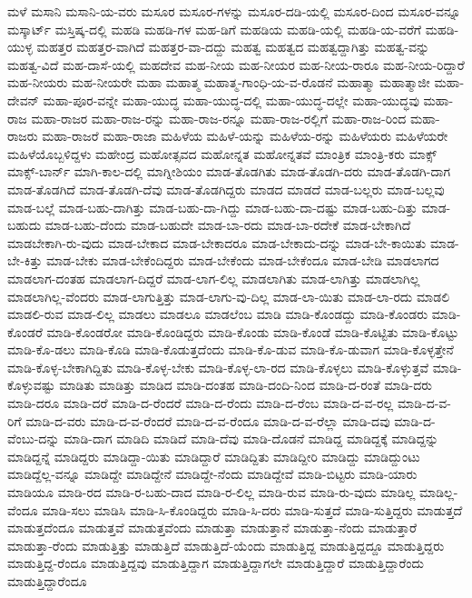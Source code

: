 {ಮಳೆ
ಮಸಾನಿ
ಮಸಾನಿ-ಯ-ವರು
ಮಸೂರ
ಮಸೂರ-ಗಳನ್ನು
ಮಸೂರ-ದಡಿ-ಯಲ್ಲಿ
ಮಸೂರ-ದಿಂದ
ಮಸೂರ-ವನ್ನೂ
ಮಸ್ಕಾರ್ಟ್
ಮಸ್ತಿಷ್ಕ-ದಲ್ಲಿ
ಮಹಡಿ
ಮಹಡಿ-ಗಳ
ಮಹ-ಡಿಗೆ
ಮಹಡಿಯ
ಮಹಡಿ-ಯಲ್ಲಿ
ಮಹಡಿ-ಯ-ವರೆಗೆ
ಮಹಡಿ-ಯುಳ್ಳ
ಮಹತ್ತರ
ಮಹತ್ತರ-ವಾಗಿದೆ
ಮಹತ್ತರ-ವಾ-ದದ್ದು
ಮಹತ್ವ
ಮಹತ್ವದ
ಮಹತ್ವದ್ದಾಗಿತ್ತು
ಮಹತ್ವ-ವನ್ನು
ಮಹತ್ವ-ವಿದೆ
ಮಹ-ದಾಸೆ-ಯಲ್ಲಿ
ಮಹದೇವ
ಮಹ-ನೀಯ
ಮಹ-ನೀಯರ
ಮಹ-ನೀಯ-ರಾರೂ
ಮಹ-ನೀಯ-ರಿದ್ದಾರೆ
ಮಹ-ನೀಯರು
ಮಹ-ನೀಯರೇ
ಮಹಾ
ಮಹಾತ್ಮ
ಮಹಾತ್ಮ-ಗಾಂಧಿ-ಯ-ವ-ರೊಡನೆ
ಮಹಾತ್ಮಾ
ಮಹಾತ್ಮಾಜೀ
ಮಹಾ-ದೇವನ್
ಮಹಾ-ಪೂರ-ವನ್ನೇ
ಮಹಾ-ಯುದ್ಧ
ಮಹಾ-ಯುದ್ಧ-ದಲ್ಲಿ
ಮಹಾ-ಯುದ್ಧ-ದಲ್ಲೇ
ಮಹಾ-ಯುದ್ಧವು
ಮಹಾ-ರಾಜ
ಮಹಾ-ರಾಜರ
ಮಹಾ-ರಾಜ-ರನ್ನು
ಮಹಾ-ರಾಜ-ರನ್ನೂ
ಮಹಾ-ರಾಜ-ರಲ್ಲಿಗೆ
ಮಹಾ-ರಾಜ-ರಿಂದ
ಮಹಾ-ರಾಜರು
ಮಹಾ-ರಾಜರೆ
ಮಹಾ-ರಾಜಾ
ಮಹಿಳೆಯ
ಮಹಿಳೆ-ಯನ್ನು
ಮಹಿಳೆಯ-ರನ್ನು
ಮಹಿಳೆಯರು
ಮಹಿಳೆಯರೇ
ಮಹಿಳೆಯೊಬ್ಬಳಿದ್ದಳು
ಮಹೇಂದ್ರ
ಮಹೋತ್ಸವದ
ಮಹೋನ್ನತ
ಮಹೋನ್ನತವೆ
ಮಾಂತ್ರಿಕ
ಮಾಂತ್ರಿ-ಕರು
ಮಾಕ್ಸ್
ಮಾಕ್ಸ್-ಬಾರ್ನ್
ಮಾಗಿ-ಕಾಲ-ದಲ್ಲಿ
ಮಾಗ್ನೀಶಿಯಂ
ಮಾಡ-ತೊಡಗಿತು
ಮಾಡ-ತೊಡಗಿ-ದರು
ಮಾಡ-ತೊಡಗಿ-ದಾಗ
ಮಾಡ-ತೊಡಗಿದೆ
ಮಾಡ-ತೊಡಗಿ-ದೆವು
ಮಾಡ-ತೊಡಗಿದ್ದರು
ಮಾಡದ
ಮಾಡದೆ
ಮಾಡ-ಬಲ್ಲರು
ಮಾಡ-ಬಲ್ಲವು
ಮಾಡ-ಬಲ್ಲೆ
ಮಾಡ-ಬಹು-ದಾಗಿತ್ತು
ಮಾಡ-ಬಹು-ದಾ-ಗಿದ್ದು
ಮಾಡ-ಬಹು-ದಾ-ದಷ್ಟು
ಮಾಡ-ಬಹು-ದಿತ್ತು
ಮಾಡ-ಬಹುದು
ಮಾಡ-ಬಹು-ದೆಂದು
ಮಾಡ-ಬಹುದೇ
ಮಾಡ-ಬಾ-ರದು
ಮಾಡ-ಬಾ-ರದೇಕೆ
ಮಾಡ-ಬೇಕಾಗಿದೆ
ಮಾಡಬೇಕಾಗಿ-ರು-ವುದು
ಮಾಡ-ಬೇಕಾದ
ಮಾಡ-ಬೇಕಾದರೂ
ಮಾಡ-ಬೇಕಾದು-ದನ್ನು
ಮಾಡ-ಬೇ-ಕಾಯಿತು
ಮಾಡ-ಬೇ-ಕಿತ್ತು
ಮಾಡ-ಬೇಕು
ಮಾಡ-ಬೇಕೆಂದಿದ್ದರು
ಮಾಡ-ಬೇಕೆಂದು
ಮಾಡ-ಬೇಕೆಂದೂ
ಮಾಡ-ಬೇಡಿ
ಮಾಡಲಾಗದ
ಮಾಡಲಾಗ-ದಂತಹ
ಮಾಡಲಾಗ-ದಿದ್ದರೆ
ಮಾಡ-ಲಾಗ-ಲಿಲ್ಲ
ಮಾಡಲಾಗಿತು
ಮಾಡ-ಲಾಗಿತ್ತು
ಮಾಡಲಾಗಿಲ್ಲ
ಮಾಡಲಾಗಿಲ್ಲ-ವೆಂದರು
ಮಾಡ-ಲಾಗುತ್ತಿತ್ತು
ಮಾಡ-ಲಾಗು-ವು-ದಿಲ್ಲ
ಮಾಡ-ಲಾ-ಯಿತು
ಮಾಡ-ಲಾ-ರದು
ಮಾಡಲಿ
ಮಾಡಲಿ-ರುವ
ಮಾಡ-ಲಿಲ್ಲ
ಮಾಡಲು
ಮಾಡಲೂ
ಮಾಡಲೆಂಬ
ಮಾಡಿ
ಮಾಡಿ-ಕೊಂಡದ್ದು
ಮಾಡಿ-ಕೊಂಡರು
ಮಾಡಿ-ಕೊಂಡರೆ
ಮಾಡಿ-ಕೊಂಡರೋ
ಮಾಡಿ-ಕೊಂಡಿದ್ದರು
ಮಾಡಿ-ಕೊಂಡು
ಮಾಡಿ-ಕೊಂಡೆ
ಮಾಡಿ-ಕೊಟ್ಟಿತು
ಮಾಡಿ-ಕೊಟ್ಟು
ಮಾಡಿ-ಕೊ-ಡಲು
ಮಾಡಿ-ಕೊಡಿ
ಮಾಡಿ-ಕೊಡುತ್ತದೆಂದು
ಮಾಡಿ-ಕೊ-ಡುವ
ಮಾಡಿ-ಕೊ-ಡುವಾಗ
ಮಾಡಿ-ಕೊಳ್ಳತ್ತೇನೆ
ಮಾಡಿ-ಕೊಳ್ಳ-ಬೇಕಾಗಿದ್ದಿತು
ಮಾಡಿ-ಕೊಳ್ಳ-ಬೇಕು
ಮಾಡಿ-ಕೊಳ್ಳ-ಲಾ-ರದ
ಮಾಡಿ-ಕೊಳ್ಳಲು
ಮಾಡಿ-ಕೊಳ್ಳುತ್ತವೆ
ಮಾಡಿ-ಕೊಳ್ಳುವಷ್ಟು
ಮಾಡಿತು
ಮಾಡಿತ್ತು
ಮಾಡಿದ
ಮಾಡಿ-ದಂತಹ
ಮಾಡಿ-ದಂದಿ-ನಿಂದ
ಮಾಡಿ-ದ-ರಂತೆ
ಮಾಡಿ-ದರು
ಮಾಡಿ-ದರೂ
ಮಾಡಿ-ದರೆ
ಮಾಡಿ-ದ-ರೆಂದರೆ
ಮಾಡಿ-ದ-ರೆಂದು
ಮಾಡಿ-ದ-ರೆಂಬ
ಮಾಡಿ-ದ-ವ-ರಲ್ಲ
ಮಾಡಿ-ದ-ವ-ರಿಗೆ
ಮಾಡಿ-ದ-ವರು
ಮಾಡಿ-ದ-ವ-ರೆಂದರೆ
ಮಾಡಿ-ದ-ವ-ರೆಂದೂ
ಮಾಡಿ-ದ-ವ-ರೆಲ್ಲಾ
ಮಾಡಿ-ದವು
ಮಾಡಿ-ದ-ವೆಂಬು-ದನ್ನು
ಮಾಡಿ-ದಾಗ
ಮಾಡಿದಿ
ಮಾಡಿದೆ
ಮಾಡಿ-ದೆವು
ಮಾಡಿ-ದೊಡನೆ
ಮಾಡಿದ್ದ
ಮಾಡಿದ್ದಕ್ಕೆ
ಮಾಡಿದ್ದನ್ನು
ಮಾಡಿದ್ದನ್ನೆ
ಮಾಡಿದ್ದರು
ಮಾಡಿದ್ದಾ-ಯಿತು
ಮಾಡಿದ್ದಾರೆ
ಮಾಡಿದ್ದಿತು
ಮಾಡಿದ್ದೀರಿ
ಮಾಡಿದ್ದು
ಮಾಡಿದ್ದುಂಟು
ಮಾಡಿದ್ದೆಲ್ಲ-ವನ್ನೂ
ಮಾಡಿದ್ದೇ
ಮಾಡಿದ್ದೇನೆ
ಮಾಡಿದ್ದೇ-ನೆಂದು
ಮಾಡಿದ್ದೇವೆ
ಮಾಡಿ-ಬಿಟ್ಟರು
ಮಾಡಿ-ಯಾರು
ಮಾಡಿಯೂ
ಮಾಡಿ-ರದ
ಮಾಡಿ-ರ-ಬಹು-ದಾದ
ಮಾಡಿ-ರ-ಲಿಲ್ಲ
ಮಾಡಿ-ರುವ
ಮಾಡಿ-ರು-ವುದು
ಮಾಡಿಲ್ಲ
ಮಾಡಿಲ್ಲ-ವೆಂದೂ
ಮಾಡಿ-ಸಲು
ಮಾಡಿಸಿ
ಮಾಡಿ-ಸಿ-ಕೊಂಡಿದ್ದರು
ಮಾಡಿ-ಸಿ-ದರು
ಮಾಡಿ-ಸುತ್ತದೆ
ಮಾಡಿ-ಸುತ್ತಿದ್ದರು
ಮಾಡುತ್ತದೆ
ಮಾಡುತ್ತದೆಂದೂ
ಮಾಡುತ್ತವೆ
ಮಾಡುತ್ತವೆಂದು
ಮಾಡುತ್ತಾ
ಮಾಡುತ್ತಾನೆ
ಮಾಡುತ್ತಾ-ನೆಂದು
ಮಾಡುತ್ತಾರೆ
ಮಾಡುತ್ತಾ-ರೆಂದು
ಮಾಡುತ್ತಿತ್ತು
ಮಾಡುತ್ತಿದೆ
ಮಾಡುತ್ತಿದೆ-ಯೆಂದು
ಮಾಡುತ್ತಿದ್ದ
ಮಾಡುತ್ತಿದ್ದದ್ದೂ
ಮಾಡುತ್ತಿದ್ದರು
ಮಾಡುತ್ತಿದ್ದ-ರೆಂದೂ
ಮಾಡುತ್ತಿದ್ದವು
ಮಾಡುತ್ತಿದ್ದಾಗ
ಮಾಡುತ್ತಿದ್ದಾಗಲೇ
ಮಾಡುತ್ತಿದ್ದಾರೆ
ಮಾಡುತ್ತಿದ್ದಾರೆಂದು
ಮಾಡುತ್ತಿದ್ದಾರೆಂದೂ
}
